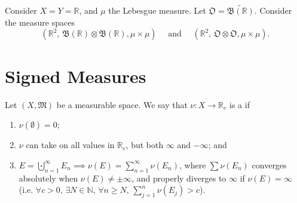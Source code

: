 \documentclass[notoc,notitlepage]{tufte-book}
\begin{document}
\begin{eg}

  Consider $X = Y = \mathbb{R}$, and $\mu$ the Lebesgue measure.
  Let $\mathfrak{O} = \widetilde{\mathfrak{B}(\mathbb{R})}$.
  Consider the measure spaces
  \begin{equation*}
    (\mathbb{R}^2,\, \mathfrak{B}(\mathbb{R}) \otimes \mathfrak{B}(\mathbb{R}),
    \mu \times \mu)
    \quad\text{ and }\quad
    (\mathbb{R}^2,\, \mathfrak{O} \otimes \mathfrak{O}, \mu \times \mu).
  \end{equation*}
\end{eg}


\section{Signed Measures}%
\label{sec:signed_measures}

\begin{defn}\label{defn:signed_measure}
  Let $(X, \mathfrak{M})$ be a measurable space.
  We say that $\nu : X \to \mathbb{R}_e$ is a 
  if
  \begin{enumerate}
    \item $\nu(\emptyset) = 0$;
    \item $\nu$ can take on all values in $\mathbb{R}_e$,
      but  both $\infty$ and $-\infty$; and
    \item $E = \bigcupdot_{n=1}^{\infty} E_n \implies \nu(E) =
      \sum_{n=1}^{\infty} \nu(E_n)$,
      where $\sum \nu(E_n)$ converges absolutely when
      $\nu(E) \neq \pm \infty$,
      and properly diverges to $\infty$ if $\nu(E) = \infty$
      (i.e. $\forall c > 0,\, \exists N \in \mathbb{N},\, \forall n \geq
      N,\, \sum_{j=1}^{n} \nu(E_j) > c$).
  \end{enumerate}
\end{defn}
\end{document}

